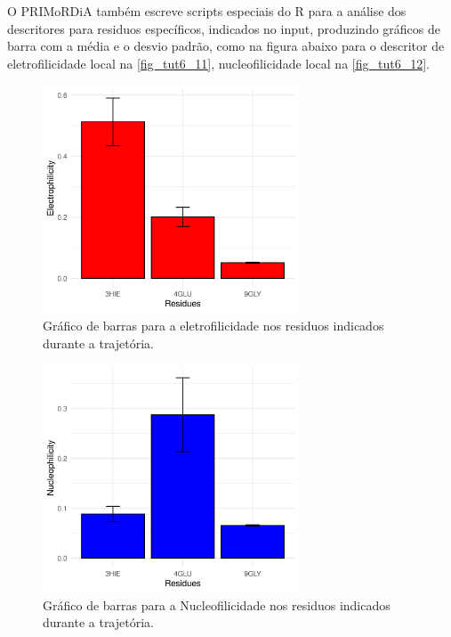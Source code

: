 \documentclass[a4paper,11pt]{refart}
\begin{document}
	 
	 O PRIMoRDiA também escreve scripts especiais do R para a análise dos descritores para residuos específicos, indicados no input, produzindo gráficos de barra com a média e o desvio padrão, como na figura abaixo para o descritor de eletrofilicidade local  na \autoref{fig_tut6_11}, nucleofilicidade local na \autoref{fig_tut6_12}.
	
	 
	 \hspace*{-\leftmarginwidth}
	 \begin{minipage}{\fullwidth}
	 	\begin{figure}[H]
	 		\begin{center}
	 			\includegraphics[width=3in]{Eph_res}
	 			\caption{Gráfico de barras para a eletrofilicidade nos residuos indicados durante a trajetória.}
	 			\label{fig_tut6_11}
	 		\end{center}
	 	\end{figure}
	 \end{minipage}
	 
	 
	 \hspace*{-\leftmarginwidth}
	 \begin{minipage}{\fullwidth}
	 	\begin{figure}[H]
	 		\begin{center}
	 			\includegraphics[width=3in]{Nph_res}
	 			\caption{Gráfico de barras para a Nucleofilicidade nos residuos indicados durante a trajetória.}
	 			\label{fig_tut6_12}
	 		\end{center}
	 	\end{figure}
	 \end{minipage}
	 
\end{document}
